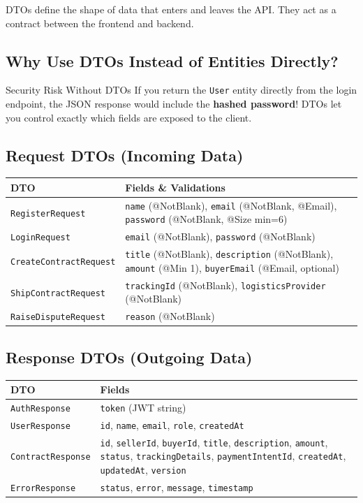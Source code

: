 \documentclass[11pt, a4paper]{article}
\begin{document}
DTOs define the shape of data that enters and leaves the API. They act as a contract between the frontend and backend.

\subsection{Why Use DTOs Instead of Entities Directly?}

\begin{warningbox}{Security Risk Without DTOs}
If you return the \texttt{User} entity directly from the login endpoint, the JSON response would include the \textbf{hashed password}! DTOs let you control exactly which fields are exposed to the client.
\end{warningbox}

\subsection{Request DTOs (Incoming Data)}

\begin{longtable}{@{}lp{8cm}@{}}
\toprule
\textbf{DTO} & \textbf{Fields \& Validations} \\
\midrule
\texttt{RegisterRequest} & \texttt{name} (@NotBlank), \texttt{email} (@NotBlank, @Email), \texttt{password} (@NotBlank, @Size min=6) \\
\texttt{LoginRequest} & \texttt{email} (@NotBlank), \texttt{password} (@NotBlank) \\
\texttt{CreateContractRequest} & \texttt{title} (@NotBlank), \texttt{description} (@NotBlank), \texttt{amount} (@Min 1), \texttt{buyerEmail} (@Email, optional) \\
\texttt{ShipContractRequest} & \texttt{trackingId} (@NotBlank), \texttt{logisticsProvider} (@NotBlank) \\
\texttt{RaiseDisputeRequest} & \texttt{reason} (@NotBlank) \\
\bottomrule
\end{longtable}

\subsection{Response DTOs (Outgoing Data)}

\begin{longtable}{@{}lp{8cm}@{}}
\toprule
\textbf{DTO} & \textbf{Fields} \\
\midrule
\texttt{AuthResponse} & \texttt{token} (JWT string) \\
\texttt{UserResponse} & \texttt{id}, \texttt{name}, \texttt{email}, \texttt{role}, \texttt{createdAt} \\
\texttt{ContractResponse} & \texttt{id}, \texttt{sellerId}, \texttt{buyerId}, \texttt{title}, \texttt{description}, \texttt{amount}, \texttt{status}, \texttt{trackingDetails}, \texttt{paymentIntentId}, \texttt{createdAt}, \texttt{updatedAt}, \texttt{version} \\
\texttt{ErrorResponse} & \texttt{status}, \texttt{error}, \texttt{message}, \texttt{timestamp} \\
\bottomrule
\end{longtable}
\end{document}
